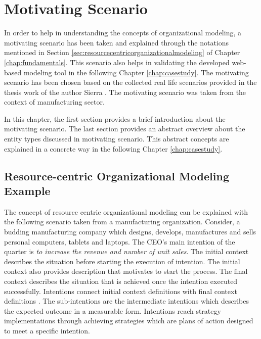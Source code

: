 \chapter{Motivating Scenario}
\label{chap:motivatingScenario}
In order to help in understanding the concepts of organizational modeling, a motivating scenario has been taken and explained through the notations mentioned in Section \ref{sec:resourcecentricorganizationalmodeling} of Chapter \ref{chap:fundamentals}. This scenario also helps in validating the developed web-based modeling tool in the following Chapter \ref{chap:casestudy}. The motivating scenario has been chosen based on the collected real life scenarios provided in the thesis work of the author Sierra \cite{Sierr2015}. The motivating scenario was taken from the context of manufacturing sector. 

In this chapter, the first section provides a brief introduction about the motivating scenario. The last section provides an abstract overview about the entity types discussed in motivating scenario. This abstract concepts are explained in a concrete way in the following Chapter \ref{chap:casestudy}.

\section{Resource-centric Organizational Modeling Example}
\label{sec:scenario}
 The concept of resource centric organizational modeling can be explained with the following scenario taken from a manufacturing organization. Consider, a budding manufacturing company which designs, develops, manufactures and sells personal computers, tablets and laptops. The CEO's main intention of the quarter is \textit{to increase the revenue and number of unit sales}. The initial context describes the situation before starting the execution of intention. The initial context also provides description that motivates to start the process. The final context describes the situation that is achieved once the intention executed successfully. Intentions connect initial context definitions with final context definitions \cite{Sungur2014a}. The sub-intentions are the intermediate intentions which describes the expected outcome in a measurable form. Intentions reach strategy implementations through achieving strategies which are plans of action designed to meet a specific intention. 
 
